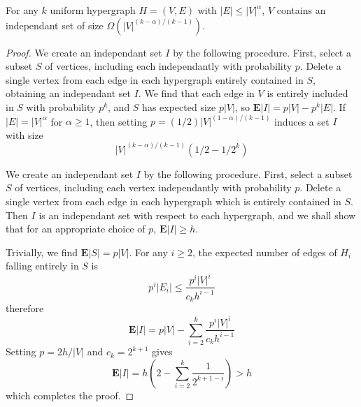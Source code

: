 \begin{lemma}[Tur\'{a}n]
    For any $k$ uniform hypergraph $H = (V,E)$ with $|E| \leq |V|^\alpha$, $V$ contains an independant set of size $\Omega(|V|^{(k-\alpha)/(k-1)})$.
\end{lemma}
\begin{proof}
    We create an independant set $I$ by the following procedure. First, select a subset $S$ of vertices, including each independantly with probability $p$. Delete a single vertex from each edge in each hypergraph entirely contained in $S$, obtaining an independant set $I$. We find that each edge in $V$ is entirely included in $S$ with probability $p^k$, and $S$ has expected size $p |V|$, so $\mathbf{E}|I| = p |V| - p^k |E|$. If $|E| = |V|^\alpha$ for $\alpha \geq 1$, then setting $p = (1/2) |V|^{(1 - \alpha)/(k-1)}$ induces a set $I$ with size
    \[ |V|^{(k - \alpha)/(k-1)}(1/2 - 1/2^k) \]

    We create an independant set $I$ by the following procedure. First, select a subset $S$ of vertices, including each vertex independantly with probability $p$. Delete a single vertex from each edge in each hypergraph which is entirely contained in $S$. Then $I$ is an independant set with respect to each hypergraph, and we shall show that for an appropriate choice of $p$, $\mathbf{E} |I| \geq h$.

    Trivially, we find $\mathbf{E}|S| = p |V|$. For any $i \geq 2$, the expected number of edges of $H_i$ falling entirely in $S$ is
    \[ p^i |E_i| \leq \frac{p^i |V|^i}{c_k h^{i-1}} \]
    therefore
    \[ \mathbf{E}|I| = p|V| - \sum_{i = 2}^k \frac{p^i |V|^i}{c_k h^{i-1}} \]
    Setting $p = 2h/|V|$ and $c_k = 2^{k+1}$ gives
    \[ \mathbf{E}|I| = h \left( 2 - \sum_{i = 2}^k \frac{1}{2^{k+1-i}} \right) > h \]
    which completes the proof.
\end{proof}